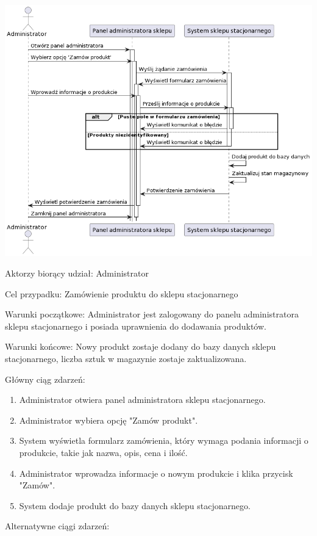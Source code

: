 \documentclass[
]{article}
\providecommand{\tightlist}{%
  \setlength{\itemsep}{0pt}\setlength{\parskip}{0pt}}
\begin{document}
{\includegraphics{diagrams/sequence/sklep_zamow_produkt_do_sklepu.png}}

\item
{Aktorzy biorący udział: Administrator}

{Cel przypadku: Zamówienie produktu do sklepu stacjonarnego}

{Warunki początkowe: Administrator jest zalogowany do panelu
administratora sklepu stacjonarnego i posiada uprawnienia do dodawania
produktów.}

{Warunki końcowe: Nowy produkt zostaje dodany do bazy danych sklepu
stacjonarnego, liczba sztuk w magazynie zostaje zaktualizowana.}

{Główny ciąg zdarzeń:}

\begin{enumerate}
\tightlist
\item
  {Administrator otwiera panel administratora sklepu stacjonarnego.}
\item
  {Administrator wybiera opcję "Zamów produkt".}
\item
  {System wyświetla formularz zamówienia, który wymaga podania
  informacji o produkcie, takie jak nazwa, opis, cena i ilość.}
\item
  {Administrator wprowadza informacje o nowym produkcie i klika przycisk
  "Zamów".}
\item
  {System dodaje produkt do bazy danych sklepu stacjonarnego.}
\end{enumerate}

{Alternatywne ciągi zdarzeń:}
\end{document}

